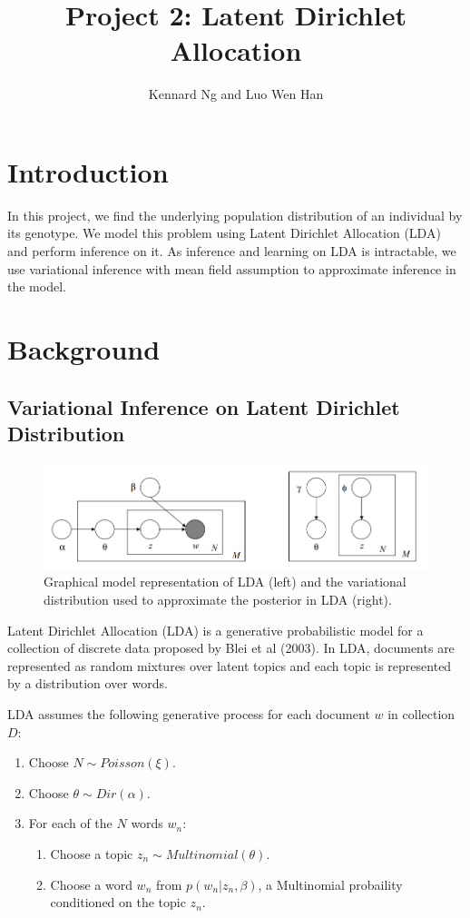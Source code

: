 \documentclass[a4paper]{article}
\author{Kennard Ng and Luo Wen Han}
\title{Project 2: Latent Dirichlet Allocation}
\begin{document}
	\maketitle
	\section{Introduction}
	
	In this project, we find the underlying population distribution of an individual by its genotype.
	We model this problem using Latent Dirichlet Allocation (LDA) and perform inference on it.
	As inference and learning on LDA is intractable, we use variational inference with mean field assumption to approximate inference in the model. 

	\section{Background}
	
	\subsection{Variational Inference on Latent Dirichlet Distribution}
	\begin{figure}[ht]
		\centering
		\includegraphics[width=1.0\linewidth]{images/LDA.png}
		\caption{Graphical model representation of LDA (left) and the variational distribution used to approximate the posterior in LDA (right).}
		\label{fig:lda}
	\end{figure}
	Latent Dirichlet Allocation (LDA) is a generative probabilistic model for a collection of discrete data proposed by Blei et al (2003).
	In LDA, documents are represented as random mixtures over latent topics and each topic is represented by a distribution over words.

	LDA assumes the following generative process for each document $w$ in collection $D$:
	\begin{enumerate}
		\item Choose $N\sim Poisson(\xi)$.
		\item Choose $\theta \sim Dir(\alpha)$.
		\item For each of the $N$ words $w_n$:
		\begin{enumerate}
			\item Choose a topic $z_n \sim Multinomial(\theta)$.
			\item Choose a word $w_n$ from $p(w_n|z_n,\beta)$, a Multinomial probaility conditioned on the topic $z_n$.
		\end{enumerate}
	\end{enumerate}
\end{document}
